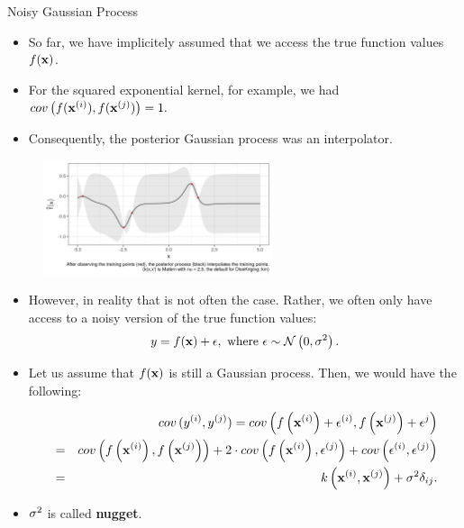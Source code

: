 \begin{frame}[c,allowframebreaks]{Noisy Gaussian Process}

\begin{itemize}
\item So far, we have implicitely assumed that we access the true function values $f(\mathbf{x})$.
\vspace{3mm}
\item For the squared exponential kernel, for example, we had
  $cov\left(f(\mathbf{x}^{(i)}), f(\mathbf{x}^{(j)})\right) = 1.$
\vspace{3mm}
\item Consequently, the posterior Gaussian process was an interpolator.
\end{itemize}

\begin{figure}
\includegraphics[width=0.6\textwidth]{figure_man/gp-interpolator.png}\par
\end{figure}

\framebreak

\begin{itemize}

\item However, in reality that is not often the case. Rather, we often only have access to a noisy version of the true function values:
  $$y = f(\mathbf{x}) + \epsilon, \text{ where } \epsilon \sim\mathcal{N}\left(0, \sigma^2\right).$$
  
\item Let us assume that $f(\mathbf{x})$ is still a Gaussian process. Then, we would have the following:
  \begin{footnotesize} 
  \begin{eqnarray*}
    &&cov\,(y^{(i)}, y^{(j)}) = cov\left(f\left(\mathbf{x}^{(i)}\right) + \epsilon^{(i)}, f\left(\mathbf{x}^{(j)}\right) + \epsilon^{j}\right) \\
    &=& cov\left(f\left(\mathbf{x}^{(i)}\right), f\left(\mathbf{x}^{(j)}\right)\right) + 2 \cdot cov\left(f\left(\mathbf{x}^{(i)}\right), \epsilon^{(j)}\right) + cov\left(\epsilon^{(i)}, \epsilon^{(j)}\right) 
    \\ &=& k\left(\mathbf{x}^{(i)}, \mathbf{x}^{(j)}\right) + \sigma^2 \delta_{ij}. 
  \end{eqnarray*}
  \end{footnotesize}
  \item[\faLightbulbO] $\sigma^2$ is called \textbf{nugget}. 
\end{itemize}


\end{frame}
